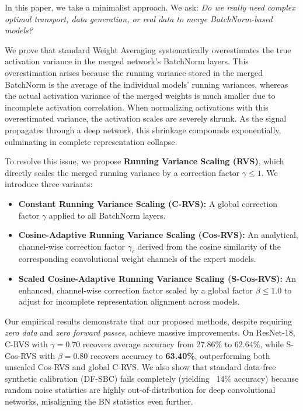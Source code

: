 \documentclass{article}
\theoremstyle{plain}
\theoremstyle{definition}
\theoremstyle{remark}
\begin{document}
In this paper, we take a minimalist approach. We ask: \emph{Do we really need complex optimal transport, data generation, or real data to merge BatchNorm-based models?} 

We prove that standard Weight Averaging systematically overestimates the true activation variance in the merged network's BatchNorm layers. This overestimation arises because the running variance stored in the merged BatchNorm is the average of the individual models' running variances, whereas the actual activation variance of the merged weights is much smaller due to incomplete activation correlation. When normalizing activations with this overestimated variance, the activation scales are severely shrunk. As the signal propagates through a deep network, this shrinkage compounds exponentially, culminating in complete representation collapse.

To resolve this issue, we propose \textbf{Running Variance Scaling (RVS)}, which directly scales the merged running variance by a correction factor $\gamma \le 1$. We introduce three variants:
\begin{itemize}
    \item \textbf{Constant Running Variance Scaling (C-RVS):} A global correction factor $\gamma$ applied to all BatchNorm layers.
    \item \textbf{Cosine-Adaptive Running Variance Scaling (Cos-RVS):} An analytical, channel-wise correction factor $\gamma_c$ derived from the cosine similarity of the corresponding convolutional weight channels of the expert models.
    \item \textbf{Scaled Cosine-Adaptive Running Variance Scaling (S-Cos-RVS):} An enhanced, channel-wise correction factor scaled by a global factor $\beta \le 1.0$ to adjust for incomplete representation alignment across models.
\end{itemize}

Our empirical results demonstrate that our proposed methods, despite requiring \textit{zero data} and \textit{zero forward passes}, achieve massive improvements. On ResNet-18, C-RVS with $\gamma=0.70$ recovers average accuracy from 27.86\% to 62.64\%, while S-Cos-RVS with $\beta=0.80$ recovers accuracy to \textbf{63.40\%}, outperforming both unscaled Cos-RVS and global C-RVS. We also show that standard data-free synthetic calibration (DF-SBC) fails completely (yielding ~14\% accuracy) because random noise statistics are highly out-of-distribution for deep convolutional networks, misaligning the BN statistics even further.
\end{document}
